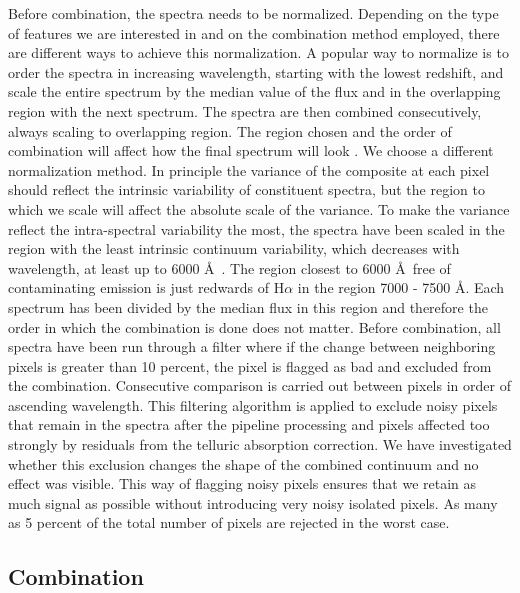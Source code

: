 \documentclass{aa}    %
\newcommand{\sectlabel}[1]{\label{sect:#1}}
\begin{document}
Before combination, the spectra needs to be normalized. Depending on the type of features we are interested in and
on the combination method employed, there are different ways to
achieve this normalization. A popular way to normalize is to order the
spectra in increasing wavelength, starting with the lowest redshift,
and scale the entire spectrum by the median value of the flux and in
the overlapping region with the next spectrum. The spectra are then
combined consecutively, always scaling to overlapping region. The
region chosen and the order of combination will affect how the final
spectrum will look
\citep{Francis1991,Brotherton2000,VandenBerk2001,Glikman2006}. We
choose a different normalization method. In principle the variance of
the composite at each pixel should reflect the intrinsic variability of constituent
spectra, but the region to which we scale will affect the absolute
scale of the variance. To make the variance reflect the intra-spectral
variability the most, the spectra have been scaled in the region with
the least intrinsic continuum variability, which decreases with
wavelength, at least up to 6000 \AA~\citep{VandenBerk2004}. The
region closest to 6000 \AA~free of contaminating emission is just
redwards of H$\alpha$ in the region 7000 - 7500 \AA. Each spectrum has
been divided by the median flux in this region and therefore the order in which the combination is done does not
matter. Before combination, all spectra have been run
through a filter where if the change between neighboring pixels is greater
than 10 percent, the pixel is flagged as bad and excluded from the
combination. Consecutive comparison is carried out between pixels in order of ascending wavelength. This filtering algorithm is applied to exclude noisy pixels that remain in the spectra after the pipeline processing and pixels affected too
strongly by residuals from the telluric absorption correction. We have investigated
whether this exclusion changes the shape of the combined continuum and
no effect was visible. This way of flagging noisy pixels ensures that
we retain as much signal as possible without introducing very noisy
isolated pixels. As many as 5 percent of the total number of pixels are
rejected in the worst case.


\subsection{Combination}  \sectlabel{combine}
\end{document}
